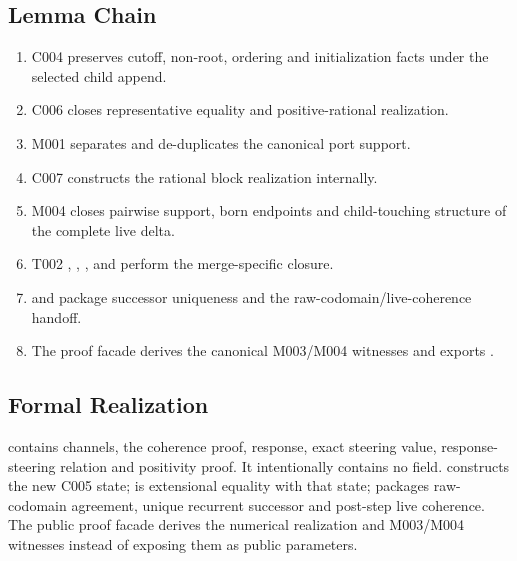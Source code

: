 \subsection{Lemma Chain}\label{lemma-chain-10}

\begin{enumerate}
\def\labelenumi{\arabic{enumi}.}
\tightlist
\item
  C004 \texttt{\protect{}} preserves cutoff, non-root,
  ordering and initialization facts under the selected child append.
\item
  C006 \texttt{\protect{}} closes representative equality
  and positive-rational realization.
\item
  M001 \texttt{\protect{}} separates and de-duplicates the
  canonical port support.
\item
  C007 \texttt{\protect{}} constructs the
  rational block realization internally.
\item
  M004 \texttt{\protect{}} closes pairwise support, born
  endpoints and child-touching structure of the complete live delta.
\item
  T002 \texttt{\protect{}},
  \texttt{\protect{}},
  \texttt{\protect{}}, and
  \texttt{\protect{}} perform the merge-specific closure.
\item
  \texttt{\protect{}} and
  \texttt{\protect{}} package successor uniqueness and the
  raw-codomain/live-coherence handoff.
\item
  The proof facade derives the canonical M003/M004 witnesses and exports
  \texttt{\protect{}}.
\end{enumerate}

\subsection{Formal Realization}\label{formal-realization-10}

\texttt{\protect{}} contains channels, the coherence proof,
response, exact steering value, response-steering relation and
positivity proof. It intentionally contains no
\texttt{\protect{}} field. \texttt{\protect{}}
constructs the new C005 state; \texttt{\protect{}} is
extensional equality with that state; \texttt{\protect{}}
packages raw-codomain agreement, unique recurrent successor and
post-step live coherence. The public proof facade derives the numerical
realization and M003/M004 witnesses instead of exposing them as public
parameters.

